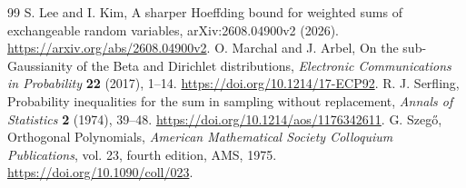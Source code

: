 \begin{thebibliography}{99}
 S. Lee and I. Kim, A sharper Hoeffding bound for weighted sums of exchangeable random variables, arXiv:2608.04900v2 (2026). \url{https://arxiv.org/abs/2608.04900v2}.
 O. Marchal and J. Arbel, On the sub-Gaussianity of the Beta and Dirichlet distributions, \emph{Electronic Communications in Probability} \textbf{22} (2017), 1--14. \url{https://doi.org/10.1214/17-ECP92}.
 R. J. Serfling, Probability inequalities for the sum in sampling without replacement, \emph{Annals of Statistics} \textbf{2} (1974), 39--48. \url{https://doi.org/10.1214/aos/1176342611}.
 G. Szeg\H{o}, Orthogonal Polynomials, \emph{American Mathematical Society Colloquium Publications}, vol. 23, fourth edition, AMS, 1975. \url{https://doi.org/10.1090/coll/023}.
\end{thebibliography}
